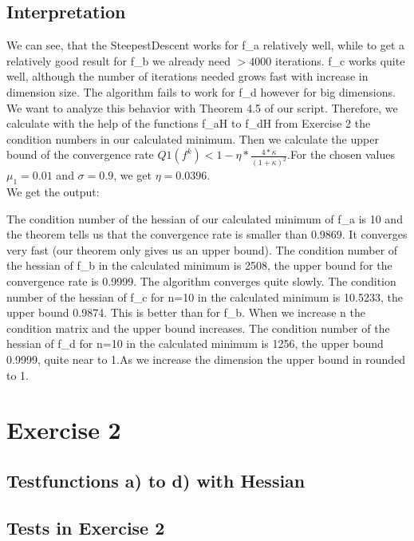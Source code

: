 \documentclass{article}
\begin{document}
	\subsection{Interpretation}
	We can see, that the SteepestDescent works for f\_a relatively well, while to get a relatively good result for f\_b we already need $>4000$ iterations.
	f\_c works quite well, although the number of iterations needed grows fast with increase in dimension size. The algorithm fails to work for f\_d however for big dimensions.\\
    We want to analyze this behavior with Theorem 4.5 of our script. Therefore, we calculate with the help of the functions f\_aH to f\_dH from Exercise 2 the condition numbers in our calculated minimum.
     Then we calculate the upper bound of the convergence rate $Q1(f^k)<1-\eta*\frac{4*\kappa}{(1+\kappa)^2}$.For the chosen values $\mu_1= 0.01$ and $\sigma=0.9$, we get $\eta=0.0396$.\\
     We get the output: 
    
    The condition number of the hessian of our calculated minimum of f\_a is 10 and the theorem tells us that the convergence rate is smaller than 0.9869. It converges very fast (our theorem only gives us an upper bound). The condition number of the hessian of f\_b in the calculated minimum is 2508, the upper bound for the convergence rate is 0.9999. The algorithm converges quite slowly. The condition number of the hessian of f\_c for n=10 in the calculated minimum is 10.5233, the upper bound 0.9874. This is better than for f\_b. When we increase n the condition matrix and the upper bound increases. The condition number of the hessian of f\_d for n=10 in the calculated minimum is 1256, the upper bound 0.9999, quite near to 1.As we increase the dimension the upper bound in rounded to 1.
	
	\section{Exercise 2}
	\subsection{Testfunctions a) to d) with Hessian}
	
	
	
	
	
	\subsection{Tests in Exercise 2}
	
\end{document}
